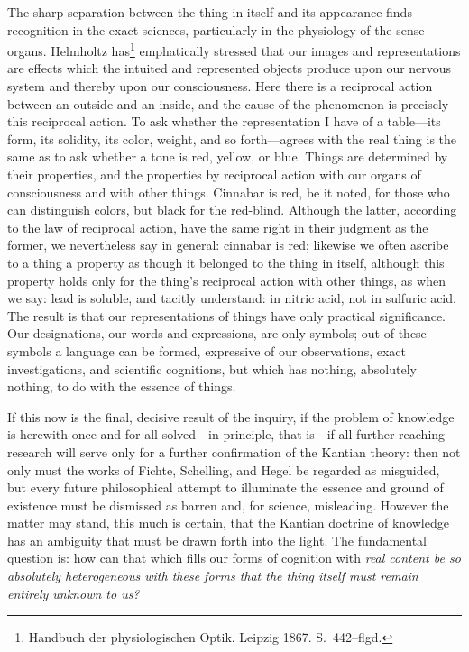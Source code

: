 \documentclass[12pt]{article}
\begin{document}
The sharp separation between the thing in itself and its appearance finds
recognition in the exact sciences, particularly in the physiology of the
sense-organs. Helmholtz has\footnote{Handbuch der physiologischen Optik.
Leipzig 1867. S.~442--flgd.} emphatically stressed that our images and
representations are effects which the intuited and represented objects
produce upon our nervous system and thereby upon our consciousness. Here
there is a reciprocal action between an outside and an inside, and the
cause of the phenomenon is precisely this reciprocal action. To ask
whether the representation I have of a table—its form, its solidity, its
color, weight, and so forth—agrees with the real thing is the same as to
ask whether a tone is red, yellow, or blue. Things are determined by their
properties, and the properties by reciprocal action with our organs of
consciousness and with other things. Cinnabar is red, be it noted, for
those who can distinguish colors, but black for the red-blind. Although the
latter, according to the law of reciprocal action, have the same right in
their judgment as the former, we nevertheless say in general: cinnabar is
red; likewise we often ascribe to a thing a property as though it belonged
to the thing in itself, although this property holds only for the thing's
reciprocal action with other things, as when we say: lead is soluble, and
tacitly understand: in nitric acid, not in sulfuric acid. The result is
that our representations of things have only practical significance. Our
designations, our words and expressions, are only symbols; out of these
symbols a language can be formed, expressive of our observations, exact
investigations, and scientific cognitions, but which has nothing,
absolutely nothing, to do with the essence of things.

If this now is the final, decisive result of the inquiry, if the problem of
knowledge is herewith once and for all solved—in principle, that is—if all
further-reaching research will serve only for a further confirmation of the
Kantian theory: then not only must the works of Fichte, Schelling, and
Hegel be regarded as misguided, but every future philosophical attempt to
illuminate the essence and ground of existence must be dismissed as barren
and, for science, misleading. However the matter may stand, this much is
certain, that the Kantian doctrine of knowledge has an ambiguity that must
be drawn forth into the light. The fundamental question is: how can that
which fills our forms of cognition with \emph{real content be so absolutely
heterogeneous with these forms that the thing itself must remain entirely
unknown to us?}
\end{document}
